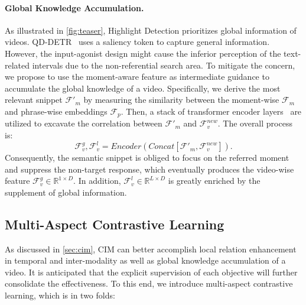 \vspace{-10pt}
\paragraph{Global Knowledge Accumulation.}
As illustrated in \cref{fig:teaser}, Highlight Detection prioritizes global information of videos.
QD-DETR~\cite{qddetr} uses a saliency token to capture general information. 
However, the input-agonist design might cause the inferior perception of the text-related intervals due to the non-referential search area.
To mitigate the concern, we propose to use the moment-aware feature as intermediate guidance to accumulate the global knowledge of a video.  
Specifically, we derive the most relevant snippet $\mathcal{F'}_m$ by measuring the similarity between the moment-wise $\mathcal{F}_m $ and phrase-wise embeddings $\mathcal{F}_p$. Then, a stack of transformer encoder layers~\cite{transformer} are utilized to excavate the correlation between $\mathcal{F'}_m$ and $\mathcal{F}_v^{new}$. The overall process is:
\begin{equation}
    \mathcal{F}_v^{g}, \mathcal{F}_v^{l} = Encoder(Concat[ \mathcal{F'}_m,\mathcal{F}_v^{new}]).
\end{equation}
Consequently, the semantic snippet is obliged to focus on the referred moment and suppress the non-target response, which eventually produces the video-wise feature $\mathcal{F}_v^{g} \in \mathbb{R}^{1\times D}$. In addition, $\mathcal{F}_v^{l} \in \mathbb{R}^{L\times D}$ is greatly enriched by the supplement of global information.  

\subsection{Multi-Aspect Contrastive Learning}
\label{sec:MACL}
As discussed in \cref{sec:cim}, CIM can better accomplish local relation enhancement in temporal and inter-modality as well as global knowledge accumulation of a video. It is anticipated that the explicit supervision of each objective will further consolidate the effectiveness. To this end, we introduce multi-aspect contrastive learning, which is in two folds:  

